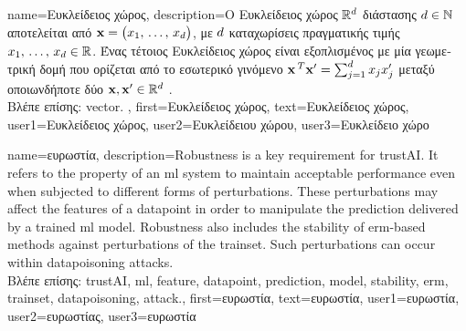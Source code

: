 {name={\foreignlanguage{greek}{Ευκλείδειος χώρος}}, 
	description={\foreignlanguage{greek}{Ο Ευκλείδειος χώρος} 
		$\mathbb{R}^{d}$ \foreignlanguage{greek}{διάστασης $d \in \mathbb{N}$ αποτελείται 
		από}  ${\bf x}= \big(x_{1}, \,\ldots, \,x_{d}\big)$, \foreignlanguage{greek}{με $d$ 
		καταχωρίσεις πραγματικής τιμής $x_{1}, \,\ldots, \,x_{d} \in \mathbb{R}$. 
		Ένας τέτοιος Ευκλείδειος χώρος είναι εξοπλισμένος με μία γεωμετρική δομή 
		που ορίζεται από το εσωτερικό γινόμενο 
		${\bf x}\,^{T} {\bf x}' = \sum_{j=1}^{d} x_{j} x'_{j}$ 
		μεταξύ οποιωνδήποτε δύο}  
		${\bf x},{\bf x}' \in \mathbb{R}^{d}$ \cite{RudinBookPrinciplesMatheAnalysis}. \\
		\foreignlanguage{greek}{Βλέπε επίσης:} \gls{vector}. },
	first={\foreignlanguage{greek}{Ευκλείδειος χώρος}}, 
	text={\foreignlanguage{greek}{Ευκλείδειος χώρος}},
	user1={\foreignlanguage{greek}{Ευκλείδειος χώρος}}, %
  	user2={\foreignlanguage{greek}{Ευκλείδειου χώρου}}, %
	user3={\foreignlanguage{greek}{Ευ\-κλεί\-δει\-ο χώρο}} %
}

{name={\foreignlanguage{greek}{ευρωστία}},
	description={Robustness is a key requirement for \gls{trustAI}. It
		refers to the property of an \gls{ml} system to maintain acceptable performance even when 
		subjected to different forms of perturbations. These perturbations may affect the \gls{feature}s 
		of a \gls{datapoint} in order to manipulate the \gls{prediction} delivered by a trained \gls{ml} \gls{model}. 
		Robustness also includes the \gls{stability} of \gls{erm}-based methods against perturbations 
		of the \gls{trainset}. Such perturbations can occur within \gls{datapoisoning} \gls{attack}s. \\
		\foreignlanguage{greek}{Βλέπε επίσης:} \gls{trustAI}, \gls{ml}, \gls{feature}, \gls{datapoint}, \gls{prediction}, 
		\gls{model}, \gls{stability}, \gls{erm}, \gls{trainset}, \gls{datapoisoning}, \gls{attack}.}, 
	first={\foreignlanguage{greek}{ευρωστία}}, 
	text={\foreignlanguage{greek}{ευρωστία}},
	user1={\foreignlanguage{greek}{ευρωστία}}, %
  	user2={\foreignlanguage{greek}{ευρωστίας}}, %
	user3={\foreignlanguage{greek}{ευρωστία}} %
}

